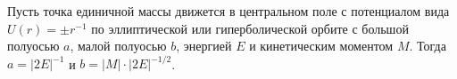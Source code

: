 \documentclass[
	extrafontsizes,
	11pt,
	hyphens,
]{memoir}
\begin{document}
%

\begin{theorem}
Пусть точка единичной массы движется в центральном поле с потенциалом вида \(U(r) = \pm r^{-1}\) по эллиптической или гиперболической орбите с большой полуосью \(a\), малой полуосью \(b\), энергией \(E\) и кинетическим моментом \(M\).%
\label{thm:KeplerTrajGeom}
Тогда \(a = \lvert 2 E \rvert^{-1}\) и \(b = \lvert M \rvert \cdot \lvert 2 E \rvert^{-1/2}\).
\end{theorem}
\end{document}
